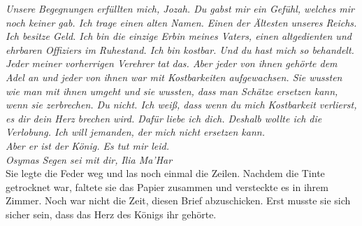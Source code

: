 \textit{Unsere Begegnungen erfüllten mich, Jozah. Du gabst mir ein Gefühl, welches mir noch keiner 
gab. Ich trage einen alten Namen. Einen der Ältesten unseres Reichs. Ich besitze Geld. Ich bin die 
einzige Erbin meines Vaters, einen altgedienten und ehrbaren Offiziers im Ruhestand. Ich bin 
kostbar. Und du hast mich so behandelt. Jeder meiner vorherrigen Verehrer tat das. Aber jeder von 
ihnen gehörte dem Adel an und jeder von ihnen war mit Kostbarkeiten aufgewachsen. Sie wussten wie 
man mit ihnen umgeht und sie wussten, dass man Schätze ersetzen kann, wenn sie zerbrechen. Du 
nicht. Ich weiß, dass wenn du mich Kostbarkeit verlierst, es dir dein Herz brechen wird. Dafür 
liebe ich dich. Deshalb wollte ich die Verlobung. Ich will jemanden, der mich nicht ersetzen 
kann.\\}
\textit{Aber er ist der König. Es tut mir leid.}\\

\textit{Osymas Segen sei mit dir,}
\textit{Ilia Ma'Har}\\

Sie legte die Feder weg und las noch einmal die Zeilen. Nachdem die Tinte getrocknet war, faltete 
sie das Papier zusammen und versteckte es in ihrem Zimmer. Noch war nicht die Zeit, diesen Brief 
abzuschicken. Erst musste sie sich sicher sein, dass das Herz des Königs ihr gehörte.
